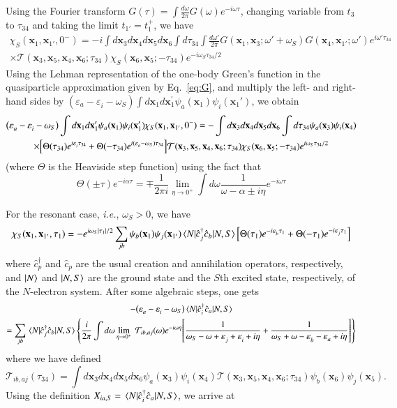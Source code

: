 \documentclass[aip,jcp,reprint,noshowkeys,superscriptaddress]{revtex4-1}
\newcommand{\ie}{\textit{i.e.}}
\newcommand{\bx}{\mathbf{x}}
\newcommand{\e}[2]{\eps_{#1}^{#2}}
\newcommand{\SO}[1]{\psi_{#1}}
\newcommand{\eps}{\varepsilon}
\newcommand{\cT}{\mathcal{T}}
\begin{document}
Using the Fourier transform $G(\tau)=\int \frac{d\omega}{2\pi}G(\omega)e^{-i\omega\tau}$, changing variable from $t_3$ to $\tau_{34}$ and taking the limit $t_{1'}=t_1^+$, we have
\begin{multline}
	\chi_S(\bx_1,\bx_{1'},0^-)
	= -i\int d\bx_3 d\bx_4 d\bx_5 d\bx_6\int d\tau_{34} \int \frac{d\omega'}{2\pi}G(\bx_1,\bx_3;\omega'+\omega_S)G(\bx_4,\bx_{1'};\omega')e^{i\omega'\tau_{34}}
	\\
	 \times \cT(\bx_3,\bx_5,\bx_4,\bx_6;\tau_{34})\chi_S(\bx_6,\bx_5;-\tau_{34})e^{-i\omega_S\tau_{34}/2}
\end{multline}
Using the Lehman representation of the one-body Green's function in the quasiparticle approximation given by Eq.~\eqref{eq:G}, and multiply the left- and right-hand sides by $(\e{a}{}-\e{i}{}-\omega_S)\int d\bx_1 d\bx^{\prime}_1 \SO{a}(\bx_1)\SO{i}(\bx_1')$, we obtain  
\begin{multline}
\label{eq:General_DYN}
	\qty(\e{a}{}-\e{i}{}-\omega_S)\int d\bx_1d\bx^{\prime}_1 \SO{a}(\bx_1)\SO{i}(\bx_1')  \chi_S(\bx_1,\bx_{1'},0^-) =
	-\int d\bx_3 d\bx_4 d\bx_5 d\bx_6\int d\tau_{34}\SO{a}(\bx_3)\SO{i}(\bx_4)
	\\
	\times \qty[\Theta(\tau_{34})e^{i\e{i}{}\tau_{34}}+\Theta(-\tau_{34})e^{i(\e{a}{}-\omega_S)\tau_{34}} ]
	\cT(\bx_3,\bx_5,\bx_4,\bx_6;\tau_{34})\chi_S(\bx_6,\bx_5;-\tau_{34})e^{i\omega_S\tau_{34}/2}
\end{multline}
(where $\Theta$ is the Heaviside step function) using the fact that
\begin{equation}
	\Theta(\pm\tau)e^{-i\alpha \tau}=\mp\frac{1}{2\pi i}\lim_{\eta\to 0^+}\int d\omega \frac{1}{\omega-\alpha\pm i\eta}e^{-i\omega\tau}
\end{equation}

For the resonant case, \ie, $\omega_S>0$, we have
\begin{equation}
\label{eq:chi_tau}
	\chi_S(\bx_1,\bx_{1'},\tau_1) 
	=-e^{i\omega_S\abs{\tau_1}/2} \sum_{jb}\SO{b}(\bx_1)\SO{j}(\bx_{1'}) \mel{N}{\hat{c}^\dagger_{j}\hat{c}_b}{N,S}
  	\qty[\Theta(\tau_1)e^{-i\e{b}{}\tau_1}+\Theta(-\tau_1)e^{-i\e{j}{}\tau_1} ]
\end{equation}
  where $\hat{c}^\dagger_{p}$ and $\hat{c}_p$ are the usual creation and annihilation operators, respectively, and $\ket{N}$ and $\ket{N,S}$ are the ground state and the $S$th excited state, respectively, of the $N$-electron system.
After some algebraic steps, one gets
\begin{multline}
	-\qty(\e{a}{}-\e{i}{}-\omega_S)\mel{N}{\hat{c}^\dagger_{i}\hat{c}_a}{N,S}
	\\
    = \sum_{jb}\mel{N}{\hat{c}^\dagger_{j}\hat{c}_b}{N,S}
    \qty{ \frac{i}{2\pi}\int d\omega \lim_{\eta \to 0^+}\ \cT_{ib,aj}(\omega) e^{-i\omega\eta} \qty[\frac{1}{\omega_S-\omega+\e{j}{}+\e{i}{}+i\eta}+\frac{1}{\omega_S+\omega-\e{b}{}-\e{a}{}+i\eta} ] }
\end{multline}
where we have defined 
\begin{equation}
	\cT_{ib,aj}(\tau_{34})=\int d\bx_3 d\bx_4 d\bx_5 d\bx_6 \SO{a}(\bx_3) \SO{i}(\bx_4)\cT(\bx_3,\bx_5,\bx_4,\bx_6;\tau_{34}) \SO{b}(\bx_6)\SO{j}(\bx_5).
\end{equation}
Using the definition $X_{ia,S}=\mel{N}{\hat{c}^\dagger_{i}\hat{c}_a}{N,S}$, we arrive at
\end{document}
